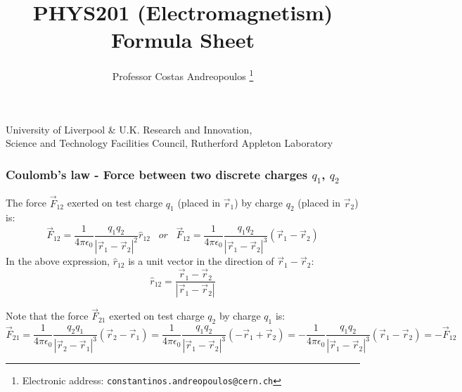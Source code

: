 \documentclass[english,11pt]{article}
\begin{document}
\title{
  {\bf PHYS201 (Electromagnetism)}\\
  Formula Sheet
}

\author{
  Professor Costas Andreopoulos
  \thanks {
    Electronic address: \texttt{constantinos.andreopoulos@cern.ch}
  }
}

\affil
{
  University of Liverpool \& U.K. Research and Innovation, \\
  Science and Technology Facilities Council, Rutherford Appleton Laboratory
}

\date{}

\maketitle

\begin{abstract}
\end{abstract}

\subsubsection*{\bf Coulomb's law - Force between two discrete charges $q_1$, $q_2$}

  \begin{itemize}
  {\small
     \item The force $\vec{F}_{12}$ exerted on test charge $q_1$
           (placed in $\vec{r}_{1}$) by charge $q_2$ (placed in $\vec{r}_{2}$) is:
     \begin{equation*}
       \vec{F}_{12} = \frac{1}{4\pi\epsilon_0} \frac{q_1 q_2}{|\vec{r}_{1}-\vec{r}_{2}|^{2}} \hat{r}_{12}
       \;\;\;
       or
       \;\;\;
       \vec{F}_{12} = \frac{1}{4\pi\epsilon_0} \frac{q_1 q_2}{|\vec{r}_{1}-\vec{r}_{2}|^{3}} (\vec{r}_{1}-\vec{r}_{2})
     \end{equation*}
     In the above expression, $\hat{r}_{12}$ is a unit vector in the direction of $\vec{r}_{1}-\vec{r}_{2}$:
     \begin{equation*}
        \hat{r}_{12} = \frac{\vec{r}_{1}-\vec{r}_{2}}{|\vec{r}_{1}-\vec{r}_{2}|}
     \end{equation*}
     \item Note that the force $\vec{F}_{21}$ exerted on test charge $q_2$ by charge $q_1$ is:
     \begin{equation*}
       \vec{F}_{21} =
          \frac{1}{4\pi\epsilon_0} \frac{q_2 q_1}{|\vec{r}_{2}-\vec{r}_{1}|^{3}} (\vec{r}_{2}-\vec{r}_{1}) =
          \frac{1}{4\pi\epsilon_0} \frac{q_1 q_2}{|\vec{r}_{1}-\vec{r}_{2}|^{3}} (-\vec{r}_{1}+\vec{r}_{2}) =
        - \frac{1}{4\pi\epsilon_0} \frac{q_1 q_2}{|\vec{r}_{1}-\vec{r}_{2}|^{3}} (\vec{r}_{1}-\vec{r}_{2}) =
        - \vec{F}_{12}
    \end{equation*}
  }
  \end{itemize}
\end{document}
